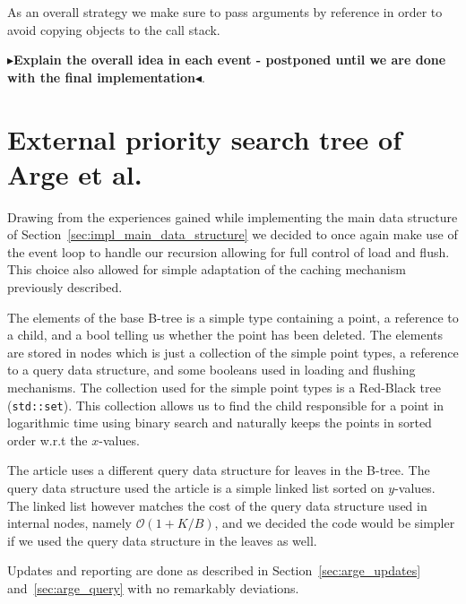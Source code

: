 \documentclass[twoside,11pt,openright]{report}
\newcommand{\todo}[1]{{\color[rgb]{.5,0,0}\textbf{$\blacktriangleright$#1$\blacktriangleleft$}}}
\begin{document}
As an overall strategy we make sure to pass arguments by reference in order to avoid copying objects to the call stack.

\todo{Explain the overall idea in each event - postponed until we are done with the final implementation}.

\section{External priority search tree of Arge et al.}
Drawing from the experiences gained while implementing the main data structure of Section~\ref{sec:impl_main_data_structure} we decided to once again make use of the event loop to handle our recursion allowing for full control of load and flush. This choice also allowed for simple adaptation of the caching mechanism previously described.

The elements of the base B-tree is a simple type containing a point, a reference to a child, and a bool telling us whether the point has been deleted. The elements are stored in nodes which is just a collection of the simple point types, a reference to a query data structure, and some booleans used in loading and flushing mechanisms. The collection used for the simple point types is a Red-Black tree (\texttt{std::set}). This collection allows us to find the child responsible for a point in logarithmic time using binary search and naturally keeps the points in sorted order w.r.t the $x$-values.

The article uses a different query data structure for leaves in the B-tree. The query data structure used the article is a simple linked list sorted on $y$-values. The linked list however matches the cost of the query data structure used in internal nodes, namely $\mathcal{O}(1 + K/B)$, and we decided the code would be simpler if we used the query data structure in the leaves as well.

Updates and reporting are done as described in Section~\ref{sec:arge_updates} and~\ref{sec:arge_query} with no remarkably deviations.


\end{document}
